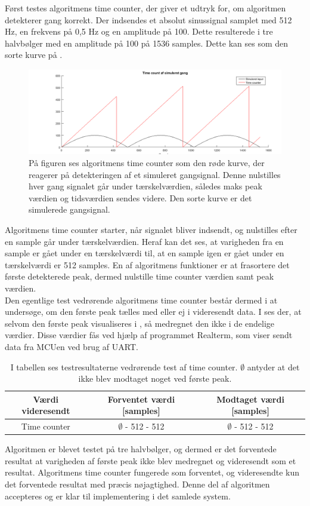 Først testes algoritmens time counter, der giver et udtryk for, om algoritmen detekterer gang korrekt. Der indsendes et absolut sinussignal samplet med 512 Hz, en frekvens på 0,5 Hz og en amplitude på 100. Dette resulterede i tre halvbølger med en amplitude på 100 på 1536 samples. Dette kan ses som den sorte kurve på .
\begin{figure}[H]
	\centering
	\includegraphics[width=.9\textwidth]{figures/cDesign/test_timecount_gang.png}
	\caption{På figuren ses algoritmens time counter som den røde kurve, der reagerer på detekteringen af et simuleret gangsignal. Denne nulstilles hver gang signalet går under tærskelværdien, således maks peak værdien og tidsværdien sendes videre. Den sorte kurve er det simulerede gangsignal.}
	\label{fig:testgraf_timecounter}
\end{figure}
Algoritmens time counter starter, når signalet bliver indsendt, og nulstilles efter en sample går under tærskelværdien. Heraf kan det ses, at varigheden fra en sample er gået under en tærskelværdi til, at en sample igen er gået under en tærskelværdi er 512 samples. En af algoritmens funktioner er at frasortere det første detekterede peak, dermed nulstille time counter værdien samt peak værdien.\\
Den egentlige test vedrørende algoritmens time counter består dermed i at undersøge, om den første peak tælles med eller ej i videresendt data. I  ses der, at selvom den første peak visualiseres i , så medregnet den ikke i de endelige værdier. Disse værdier fås ved hjælp af programmet Realterm, som viser sendt data fra MCUen ved brug af UART.
\begin{table}[H]
	\centering
	\begin{tabular}{ccc}
		\hline
		\rowcolor[HTML]{C0C0C0} 
		Værdi videresendt & Forventet værdi [samples] & Modtaget værdi [samples] \\ \hline
		Time counter & $\emptyset$ - 512 - 512 & $\emptyset$ - 512 - 512 \\ \hline
	\end{tabular}
	\caption{I tabellen ses testresultaterne vedrørende test af time counter. $\emptyset$ antyder at det ikke blev modtaget noget ved første peak.}
	\label{tab:test_res_timecount}
\end{table} \vspace{-0.5cm}
Algoritmen er blevet testet på tre halvbølger, og dermed er det forventede resultat at varigheden af første peak ikke blev medregnet og videresendt som et resultat. Algoritmens time counter fungerede som forventet, og videresendte kun det forventede resultat med præcis nøjagtighed. Denne del af algoritmen accepteres og er klar til implementering i det samlede system.

